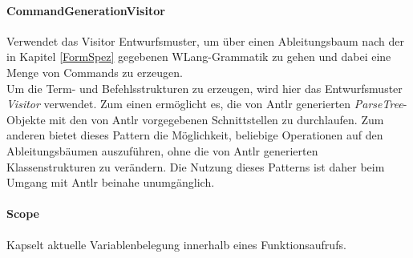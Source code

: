 \documentclass[parskip=full]{scrartcl}
\begin{document}
\paragraph{CommandGenerationVisitor}
Verwendet das Visitor Entwurfsmuster, um über einen Ableitungsbaum nach der in Kapitel \ref{FormSpez} gegebenen WLang-Grammatik zu gehen und dabei eine Menge von Commands zu erzeugen. \\
Um die Term- und Befehlsstrukturen zu erzeugen, wird  hier das Entwurfsmuster \textit{Visitor} verwendet. Zum einen ermöglicht es, die von Antlr generierten \textit{ParseTree}-Objekte mit den von Antlr vorgegebenen Schnittstellen zu durchlaufen. Zum anderen bietet dieses Pattern die Möglichkeit, beliebige Operationen auf den Ableitungsbäumen auszuführen, ohne die von Antlr generierten Klassenstrukturen zu verändern. Die Nutzung dieses Patterns ist daher beim Umgang mit Antlr beinahe unumgänglich.
\paragraph{Scope}
Kapselt aktuelle Variablenbelegung innerhalb eines Funktionsaufrufs.
\end{document}
